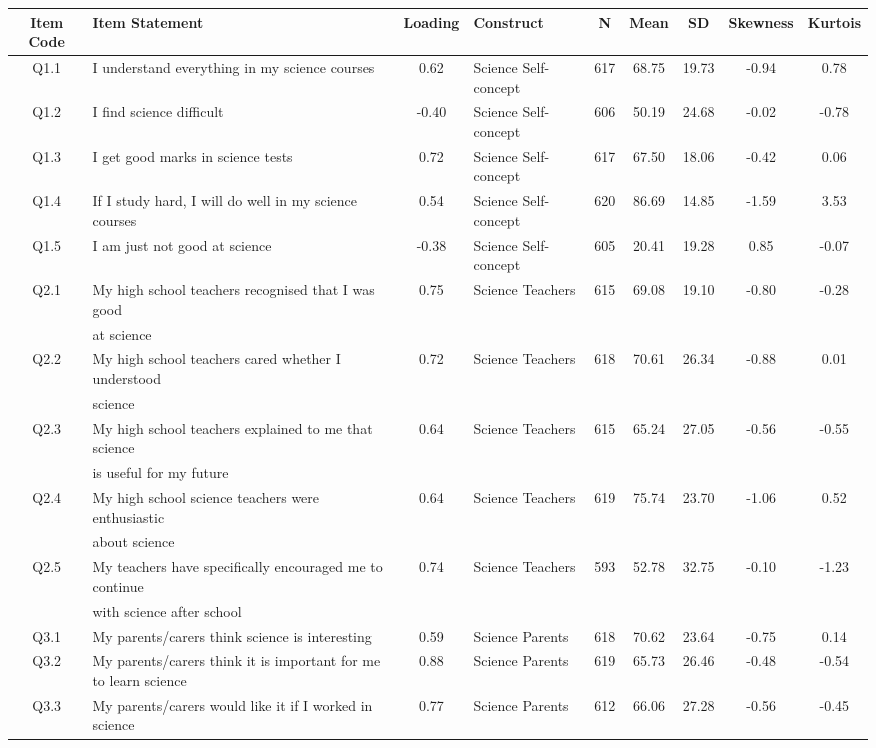 \begin{landscape}
\begin{table}[ht]
\centering
\begin{tabular}[width = \textwidth]{clclccccc}
  \hline
Item Code & Item Statement & Loading & Construct & N & Mean & SD & Skewness & Kurtois \\
  \hline
Q1.1 & I understand everything in my science courses & 0.62 & Science Self-concept & 617 &68.75 & 19.73& -0.94&0.78\\
Q1.2 &   I find science difficult & -0.40 & Science Self-concept & 606 & 50.19 & 24.68 & -0.02&-0.78\\
Q1.3 &   I get good marks in science tests & 0.72 & Science Self-concept &617 & 67.50&18.06 & -0.42&0.06\\
Q1.4 &  If I study hard, I will do well in my science courses & 0.54 & Science Self-concept &620&86.69 &14.85	 &-1.59&3.53\\
Q1.5 &  I am just not good at science & -0.38 & Science Self-concept & 605& 20.41& 19.28& 0.85&-0.07\\
  \hline
Q2.1 &  My high school teachers recognised that I was good & 0.75 & Science Teachers &615&69.08	 &19.10 & -0.80&-0.28\\
&at science&&&&&&&\\
Q2.2 &  My high school teachers cared whether I understood& 0.72 & Science Teachers &618&70.61 &26.34 & -0.88&0.01\\
&science&&&&&&&\\
Q2.3 &  My high school teachers explained to me that science& 0.64 & Science Teachers &615&65.24&27.05 &-0.56	&-0.55	\\
& is useful for my future&&&&&&& \\
Q2.4 &   My high school science teachers were enthusiastic & 0.64 & Science Teachers &619	&75.74&23.70 & -1.06&0.52	\\
&about science&&&&&&& \\
Q2.5 &  My teachers have specifically encouraged me to continue & 0.74 & Science Teachers &593&52.78&32.75 & -0.10&-1.23\\
& with science after school&&&&&&& \\
  \hline
Q3.1 & My parents/carers think science is interesting & 0.59 & Science Parents &618	&70.62&	23.64	 &-0.75	&0.14  \\
Q3.2 & My parents/carers think it is important for me to learn science & 0.88 & Science Parents &619&65.73&26.46	 &-0.48	&-0.54	\\  
Q3.3 & My parents/carers would like it if I worked in science & 0.77 & Science Parents   &612&66.06&27.28 & -0.56&-0.45\\

\end{tabular}
\end{table}
\end{landscape}
